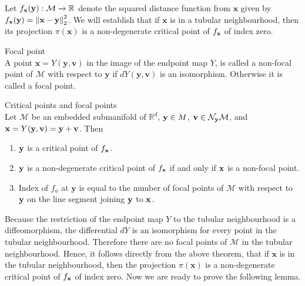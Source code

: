 Let $f_\textup{\textbf{x}}(\textbf{y}): \mathcal{M} \xrightarrow[]{} \mathbb{R}$  denote the squared distance function from $\textbf{x}$ given by $f_\textup{\textbf{x}}(\textbf{y}) = \left\lVert \textbf{x} - \textbf{y} \right\rVert_2^2$.
We will establish that if $\textbf{x}$ is in a tubular neighbourhood, then its projection $\pi(\textbf{x})$ is a non-degenerate critical point of $f_\textup{\textbf{x}}$ of index zero.


\begin{definition}
Focal point \\
A point $\textbf{x} =Y(\textbf{y}, \textbf{v})$ in the image of the endpoint map $Y$, is called a non-focal point of $\mathcal{M}$ with respect to $\textbf{y}$ if $dY(\textbf{y},\textbf{v})$ is an isomorphism. Otherwise it is called a focal point.
\end{definition}

\begin{theorem}
Critical points and focal points \cite{palais1988critical}
 \\
Let $\mathcal{M}$ be an embedded submanifold of $\mathbb{R}^d$, $\textup{\textbf{y}} \in M$, $\textup{\textbf{v}} \in \mathcal{N}_\textup{\textbf{y}}\mathcal{M}$, and $\textup{\textbf{x}} = Y (\textup{\textbf{y}},\textup{\textbf{v}}) = \textup{\textbf{y}} + \textup{\textbf{v}}$. Then
\begin{enumerate}
    \item $\textup{\textbf{y}}$ is a critical point of $f_\textup{\textbf{x}}$.
    \item $\textup{\textbf{y}}$ is a non-degenerate critical point of $f_\textup{\textbf{x}}$ if and only if $\textup{\textbf{x}}$ is a non-focal point.
    \item Index of $f_a$ at $\textbf{y}$ is equal to the number of focal points of $\mathcal{M}$ with respect to $\textup{\textbf{y}}$ on the line segment joining $\textup{\textbf{y}}$ to $\textup{\textbf{x}}$.
\end{enumerate}
\end{theorem}
Because the restriction of the endpoint map $Y$ to the tubular neighbourhood is a diffeomorphism, the differential $dY$ is an isomorphism for every point in the tubular neighbourhood. Therefore there are no focal points of $\mathcal{M}$ in the tubular neighbourhood. Hence, it follows directly from the above theorem, that if $\textbf{x}$ is in the tubular neighbourhood, then the projection $\pi(\textbf{x})$ is a non-degenerate critical point of $f_\textup{\textbf{x}}$ of index zero. Now we are ready to prove the following lemma.

